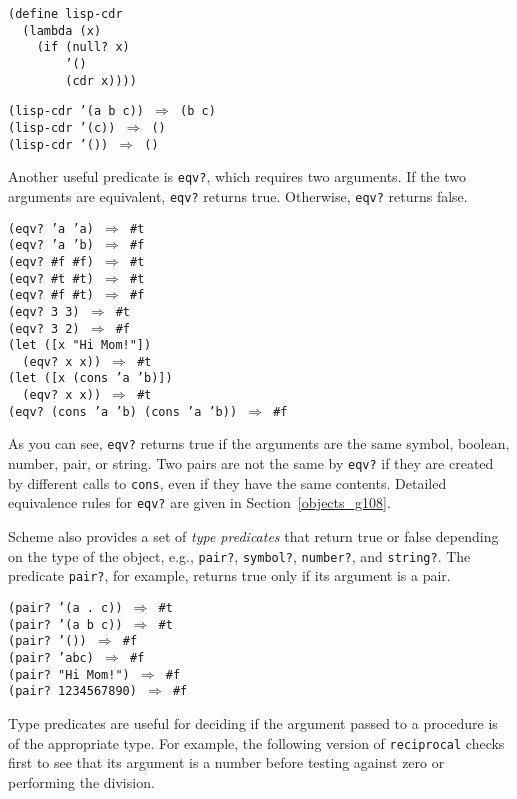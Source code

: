 \begin{alltt}
(define lisp-cdr
  (lambda (x)
    (if (null? x)
        '()
        (cdr x))))

(lisp-cdr '(a b c)) \(\Rightarrow\) (b c)
(lisp-cdr '(c)) \(\Rightarrow\) ()
(lisp-cdr '()) \(\Rightarrow\) ()
\end{alltt}


Another useful predicate is \label{start_s116}\texttt{eqv?}, which
requires two arguments.
If the two arguments are equivalent, \texttt{eqv?} returns true.
Otherwise, \texttt{eqv?} returns false.


\begin{alltt}
(eqv? 'a 'a) \(\Rightarrow\) \#{}t
(eqv? 'a 'b) \(\Rightarrow\) \#{}f
(eqv? \#{}f \#{}f) \(\Rightarrow\) \#{}t
(eqv? \#{}t \#{}t) \(\Rightarrow\) \#{}t
(eqv? \#{}f \#{}t) \(\Rightarrow\) \#{}f
(eqv? 3 3) \(\Rightarrow\) \#{}t
(eqv? 3 2) \(\Rightarrow\) \#{}f
(let ([x "Hi Mom!"])
  (eqv? x x)) \(\Rightarrow\) \#{}t
(let ([x (cons 'a 'b)])
  (eqv? x x)) \(\Rightarrow\) \#{}t
(eqv? (cons 'a 'b) (cons 'a 'b)) \(\Rightarrow\) \#{}f
\end{alltt}


As you can see, \texttt{eqv?} returns true if the arguments are the same
symbol, boolean, number, pair, or string.
Two pairs are not the same by \texttt{eqv?} if they are created by different
calls to \texttt{cons}, even if they have the same contents.
Detailed equivalence rules for \texttt{eqv?} are given in Section \ref{objects_g108}.


Scheme also provides a set
of \label{start_s117}\textit{type predicates} that return true
or false depending on the type of the object, e.g., \label{start_s118}\texttt{pair?},
\label{start_s119}\texttt{symbol?}, \label{start_s120}\texttt{number?}, and \label{start_s121}\texttt{string?}.
The predicate \label{start_s122}\texttt{pair?}, for example, returns true only if its argument
is a pair.


\begin{alltt}
(pair? '(a . c)) \(\Rightarrow\) \#{}t
(pair? '(a b c)) \(\Rightarrow\) \#{}t
(pair? '()) \(\Rightarrow\) \#{}f
(pair? 'abc) \(\Rightarrow\) \#{}f
(pair? "Hi Mom!") \(\Rightarrow\) \#{}f
(pair? 1234567890) \(\Rightarrow\) \#{}f
\end{alltt}


Type predicates are useful for deciding if the argument passed to a
procedure is of the appropriate type.
For example, the following version of \label{start_s123}\texttt{reciprocal} checks first to
see that its argument is a number before testing against zero or
performing the division. 


